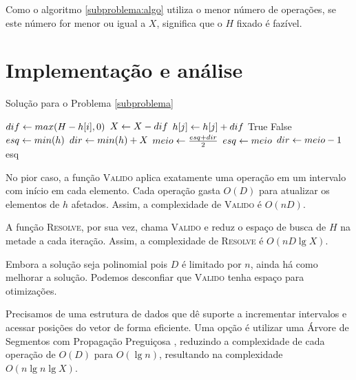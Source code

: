 Como o algoritmo \ref{subproblema:algo} utiliza o menor número de operações, se este número for menor ou igual a $X$, significa que o $H$ fixado é fazível.

\section{Implementação e análise}

\begin{algorithm}[H]
\caption{Solução para o Problema \ref{subproblema}}
\label{subproblema:code}
\begin{algorithmic}[1]
        \State $dif \leftarrow max(H - h[i], 0)$
        \State $X \leftarrow X - dif$
            \State $h[j] \leftarrow h[j] + dif$
        \EndFor
    \EndFor
        \State \Return True
    \Else
        \State \Return False
    \EndIf
\EndFunction
{}
    \State $esq \leftarrow min(h)$
    \State $dir \leftarrow min(h) + X$
        \State $meio \leftarrow \frac{esq + dir}{2}$
            \State $esq \leftarrow meio$
        \Else
            \State $dir \leftarrow meio - 1$
        \EndIf
    \EndWhile
    \State \Return esq
\EndFunction
\end{algorithmic}
\end{algorithm}

No pior caso, a função \textsc{Valido} aplica exatamente uma operação em um intervalo com início em cada elemento. Cada operação gasta $O(D)$ para atualizar os elementos de $h$ afetados. Assim, a complexidade de \textsc{Valido} é $O(nD)$.

A função \textsc{Resolve}, por sua vez, chama \textsc{Valido} e reduz o espaço de busca de $H$ na metade a cada iteração. Assim, a complexidade de \textsc{Resolve} é $O(nD \lg X)$.

Embora a solução seja polinomial pois $D$ é limitado por $n$, ainda há como melhorar a solução. Podemos desconfiar que \textsc{Valido} tenha espaço para otimizações. 

Precisamos de uma estrutura de dados que dê suporte a incrementar intervalos e acessar posições do vetor de forma eficiente. Uma opção é utilizar uma Árvore de Segmentos com Propagação Preguiçosa \cite{matheusmso}, reduzindo a complexidade de cada operação de $O(D)$ para $O(\lg n)$, resultando na complexidade $O(n \lg n \lg X)$.

